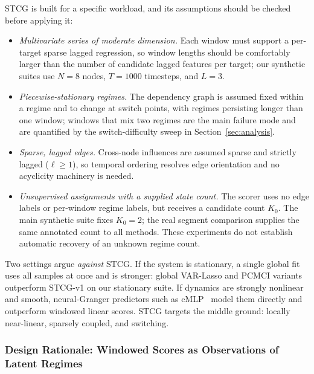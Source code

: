 \documentclass[sigconf,anonymous]{acmart}
\begin{document}
STCG is built for a specific workload, and its assumptions should be checked before applying it:
\begin{itemize}
\item \emph{Multivariate series of moderate dimension.} Each window must support a per-target sparse lagged regression, so window lengths should be comfortably larger than the number of candidate lagged features per target; our synthetic suites use $N{=}8$ nodes, $T{=}1000$ timesteps, and $L{=}3$.
\item \emph{Piecewise-stationary regimes.} The dependency graph is assumed fixed within a regime and to change at switch points, with regimes persisting longer than one window; windows that mix two regimes are the main failure mode and are quantified by the switch-difficulty sweep in Section~\ref{sec:analysis}.
\item \emph{Sparse, lagged edges.} Cross-node influences are assumed sparse and strictly lagged ($\ell \geq 1$), so temporal ordering resolves edge orientation and no acyclicity machinery is needed.
\item \emph{Unsupervised assignments with a supplied state count.} The scorer uses no edge labels or per-window regime labels, but receives a candidate count $K_0$. The main synthetic suite fixes $K_0{=}2$; the real segment comparison supplies the same annotated count to all methods. These experiments do not establish automatic recovery of an unknown regime count.
\end{itemize}
Two settings argue \emph{against} STCG.
If the system is stationary, a single global fit uses all samples at once and is stronger: global VAR-Lasso and PCMCI variants outperform STCG-v1 on our stationary suite.
If dynamics are strongly nonlinear and smooth, neural-Granger predictors such as cMLP~\cite{tank2021neural} model them directly and outperform windowed linear scores.
STCG targets the middle ground: locally near-linear, sparsely coupled, and switching.

\subsubsection{Design Rationale: Windowed Scores as Observations of Latent Regimes}
\label{sec:method-rationale}
\end{document}
